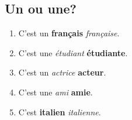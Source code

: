 \subsection{Un ou une?}
\begin{enumerate}
    \item C'est un \textbf{français} \emph{française}.
    \item C'est une \emph{étudiant} \textbf{étudiante}.
    \item C'est un \emph{actrice} \textbf{acteur}.
    \item C'est une \emph{ami} \textbf{amie}.
    \item C'est \textbf{italien} \emph{italienne}.
\end{enumerate}
